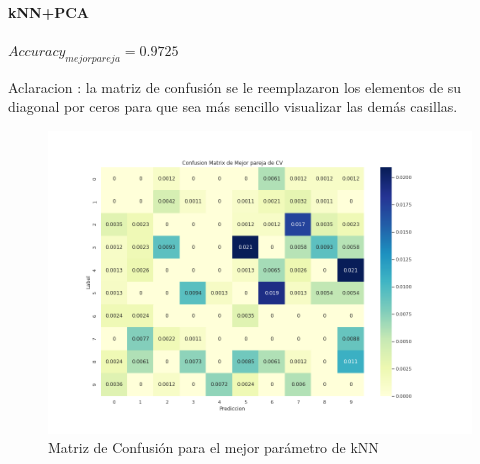 \paragraph{kNN+PCA}


\vspace{0.5cm}
$Accuracy_{mejor pareja} = 0.9725 $
\par
\vspace{0.5cm}
Aclaracion : la matriz de confusión se le reemplazaron los elementos de su diagonal por ceros para que sea más sencillo visualizar las demás casillas.
\begin{figure}[H]
    \centering
    \includegraphics[width=14cm]{images/ConfMatrix_knnpca.png}%
    \qquad
    \caption{Matriz de Confusión para el mejor parámetro de kNN }
    \label{knnpca_MatrizConf}%
\end{figure}


